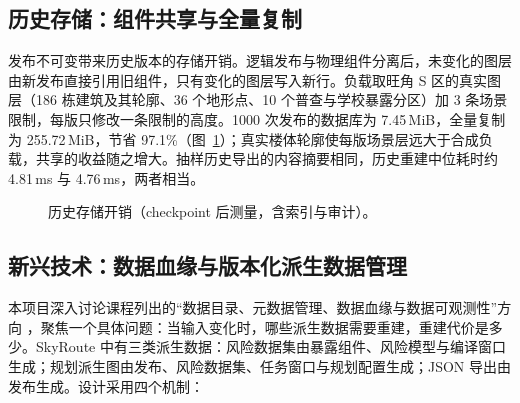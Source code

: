\documentclass[a4paper,11pt,UTF8]{ctexart}
\begin{document}
\subsection{历史存储：组件共享与全量复制}

发布不可变带来历史版本的存储开销。逻辑发布与物理组件分离后，未变化的图层由新发布直接引用旧组件，只有变化的图层写入新行。负载取旺角 S 区的真实图层（186 栋建筑及其轮廓、36 个地形点、10 个普查与学校暴露分区）加 3 条场景限制，每版只修改一条限制的高度。1000 次发布的数据库为 7.45\,MiB，全量复制为 255.72\,MiB，节省 97.1\%（图~\ref{fig:storage}）；真实楼体轮廓使每版场景层远大于合成负载，共享的收益随之增大。抽样历史导出的内容摘要相同，历史重建中位耗时约 4.81\,ms 与 4.76\,ms，两者相当。

\begin{figure}[htbp]\centering
{}
\caption{历史存储开销（checkpoint 后测量，含索引与审计）。}\label{fig:storage}
\end{figure}

\subsection{新兴技术：数据血缘与版本化派生数据管理}

本项目深入讨论课程列出的“数据目录、元数据管理、数据血缘与数据可观测性”方向 \cite{course}，聚焦一个具体问题：当输入变化时，哪些派生数据需要重建，重建代价是多少。SkyRoute 中有三类派生数据：风险数据集由暴露组件、风险模型与编译窗口生成；规划派生图由发布、风险数据集、任务窗口与规划配置生成；JSON 导出由发布生成。设计采用四个机制：
\end{document}

